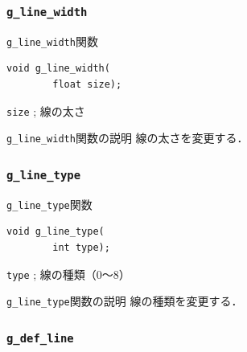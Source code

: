 \documentclass[platex,a4paper,12pt]{jsarticle}%
\begin{document}
\subsubsection{\texttt{g\_line\_width}}

\begin{itembox}[l]{\texttt{g\_line\_width}関数}
\begin{verbatim}
void g_line_width(
        float size);
\end{verbatim}
\verb|size| ; 線の太さ
\end{itembox}

\begin{itembox}[l]{\texttt{g\_line\_width}関数の説明}
線の太さを変更する．
\end{itembox}

\subsubsection{\texttt{g\_line\_type}}

\begin{itembox}[l]{\texttt{g\_line\_type}関数}
\begin{verbatim}
void g_line_type(
        int type);
\end{verbatim}
\verb|type| ; 線の種類（0〜8）
\end{itembox}

\begin{itembox}[l]{\texttt{g\_line\_type}関数の説明}
線の種類を変更する．
\end{itembox}

\begin{figure}[htb]
\end{figure}



\clearpage
\subsubsection{\texttt{g\_def\_line}}
\end{document}
